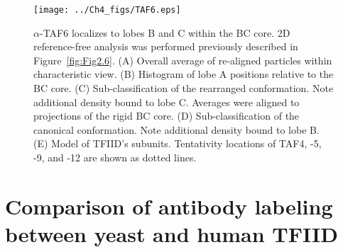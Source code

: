 \indent 
\begin{figure}
\centering
\texttt{[image: ../Ch4\_figs/TAF6.eps]}
\caption[$\alpha$-TAF6 localizes to lobes B and C within the BC core]{$\alpha$-TAF6 localizes to lobes B and C within the BC core. 2D reference-free analysis was performed previously described in Figure~\ref{fig:Fig2.6}. (A) Overall average of re-aligned particles within characteristic view. (B) Histogram of lobe A positions relative to the BC core. (C) Sub-classification of the rearranged conformation. Note additional density bound to lobe C. Averages were aligned to projections of the rigid BC core. (D) Sub-classification of the canonical conformation. Note additional density bound to lobe B. (E) Model of TFIID's subunits. Tentativity locations of TAF4, -5, -9, and -12 are shown as dotted lines.  }
\label{fig:TAF6}
\end{figure}

\section{Comparison of antibody labeling between yeast and human TFIID}

